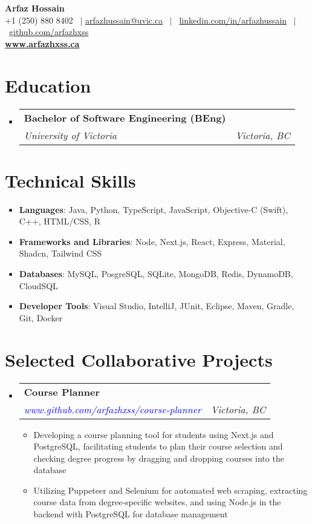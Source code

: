 \documentclass[a4paper,10pt]{article}
\makeatletter
\newcommand{\TechSkillItems}[2]
{\item \normalsize{\textbf{#1}{: #2}}}
\newcommand{\resumeItemDot}[1]
{\item \normalsize{#1}}
\newcommand{\resumeSubheading}[4]{
  \item
    \begin{tabular*}{\dimexpr\textwidth-1.2em\relax}{@{}l@{\extracolsep{\fill}}r@{}}
      \large \textbf{#1} & \fontsize{11}{12}\selectfont \text{#2} \\
      \textit{#3} & \textit{#4} \\
    \end{tabular*}\vspace{-2pt}
}
\newcommand{\resumeSubItem}[2]{\TechSkillItems{#1}{#2}}
\newenvironment{resumeSubHeadingListStart}
{\begin{itemize}[leftmargin=0.10in, label={}]}
{\end{itemize}}
\newenvironment{resumeItemListStart}
{\begin{itemize}[leftmargin=0.15in, label={$\bullet$}]}
{\end{itemize}}
\makeatother
\begin{document}
\begin{center}
    \textbf{\Huge Arfaz Hossain} \\ \vspace{2pt}
    +1 (250) 880 8402 \ $|$     \href{mailto:arfazhussain@uvic.ca}
    {arfazhussain@uvic.ca} \ $|$ \ 
    \href{https://www.linkedin.com/in/arfazhussain}{linkedin.com/in/arfazhussain} \ $|$ \ 
    \href{https://github.com/arfazhxss}{github.com/arfazhxss} \vspace{2pt} \\
    \href{https://www.arfazhxss.ca}{\large \textbf{www.arfazhxss.ca}}
\end{center}

\section{Education}
\begin{resumeSubHeadingListStart}
\resumeSubheading
    {Bachelor of Software Engineering (BEng)}
    {Sept. 2021 – Present}
    {University of Victoria}
    {Victoria, BC}
\end{resumeSubHeadingListStart}

\section{Technical Skills}
\begin{resumeSubHeadingListStart}
\resumeSubItem{Languages}{Java, Python, TypeScript, JavaScript, Objective-C (Swift), C++, HTML/CSS, R}
\resumeSubItem{Frameworks and Libraries}{Node, Next.js, React, Express, Material, Shadcn, Tailwind CSS}
\resumeSubItem{Databases}{MySQL, PosgreSQL, SQLite, MongoDB, Redis, DynamoDB, CloudSQL}
\resumeSubItem{Developer Tools}{Visual Studio, IntelliJ, JUnit, Eclipse, Maven, Gradle, Git, Docker}
\end{resumeSubHeadingListStart}

\section{Selected Collaborative Projects}
\begin{resumeSubHeadingListStart}
\resumeSubheading
    {Course Planner}
    {Feb 2024 – Present}
    {\textcolor{blue}{www.github.com/arfazhxss/course-planner}}
    {Victoria, BC}
\begin{resumeItemListStart}
    \resumeItemDot{Developing a course planning tool for students using Next.js and PostgreSQL, facilitating students to plan their course selection and checking degree progress by dragging and dropping courses into the database}
    \resumeItemDot{Utilizing Puppeteer and Selenium for automated web scraping, extracting course data from degree-specific websites, and using Node.js in the backend with PostgreSQL for database management}
\end{resumeItemListStart}
\end{resumeSubHeadingListStart}
\end{document}
